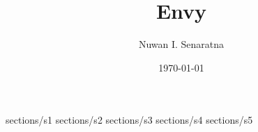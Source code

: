 \documentclass[AEJ]{AEA}
\title{Envy}
\author{Nuwan I. Senaratna}
\date{\today}
\begin{document}
\maketitle

 {sections/s1}
 {sections/s2}
 {sections/s3}
 {sections/s4}
 {sections/s5}


\end{document}
